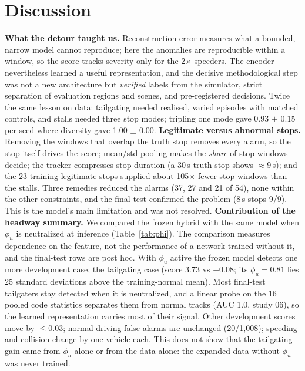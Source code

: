 \documentclass[10pt,a4paper,twocolumn]{article}
\begin{document}
\section{Discussion}\label{sec:disc}
\textbf{What the detour taught us.} Reconstruction error measures what a bounded, narrow model cannot reproduce; here the anomalies are reproducible within a window, so the score tracks severity only for the 2$\times$ speeders. The encoder nevertheless learned a useful representation, and the decisive methodological step was not a new architecture but \emph{verified} labels from the simulator, strict separation of evaluation regions and scenes, and pre-registered decisions. Twice the same lesson on data: tailgating needed realised, varied episodes with matched controls, and stalls needed three stop modes; tripling one mode gave 0.93 $\pm$ 0.15 per seed where diversity gave 1.00 $\pm$ 0.00.
\textbf{Legitimate versus abnormal stops.} Removing the windows that overlap the truth stop removes every alarm, so the stop itself drives the score; mean/std pooling makes the \emph{share} of stop windows decide; the tracker compresses stop duration (a 30\,s truth stop shows $\approx$9\,s); and the 23 training legitimate stops supplied about 105$\times$ fewer stop windows than the stalls. Three remedies reduced the alarms (37, 27 and 21 of 54), none within the other constraints, and the final test confirmed the problem (8\,s stops 9/9). This is the model's main limitation and was not resolved.
\textbf{Contribution of the headway summary.} We compared the frozen hybrid with the same model when $\phi_u$ is neutralized at inference (Table~\ref{tab:phi}). The comparison measures dependence on the feature, not the performance of a network trained without it, and the final-test rows are post hoc. With $\phi_u$ active the frozen model detects one more development case, the tailgating case (score 3.73 vs $-0.08$; its $\phi_u=0.81$ lies 25 standard deviations above the training-normal mean). Most final-test tailgaters stay detected when it is neutralized, and a linear probe on the 16 pooled code statistics separates them from normal tracks (AUC 1.0, study 06), so the learned representation carries most of their signal. Other development scores move by $\le$0.03; normal-driving false alarms are unchanged (20/1{,}008); speeding and collision change by one vehicle each. This does not show that the tailgating gain came from $\phi_u$ alone or from the data alone: the expanded data without $\phi_u$ was never trained.
\end{document}

